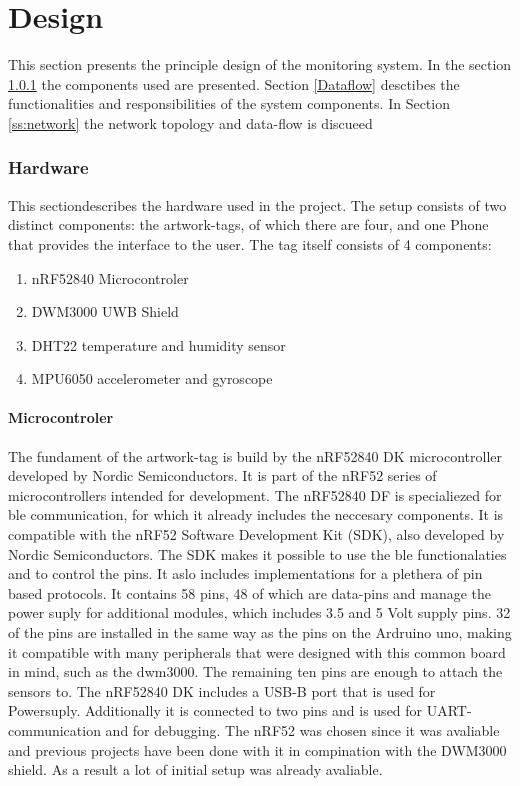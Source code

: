 \chapter{Design}

This section presents the principle design of the monitoring system.
In the section \ref{ss:hardware} the components used are presented.
Section \ref{Dataflow} desctibes the functionalities and responsibilities of the system components.
In Section \ref{ss:network} the network topology and data-flow is discueed

\subsection{Hardware}
\label{ss:hardware}

This sectiondescribes the hardware used in the project. The setup consists of two distinct components: the artwork-tags, of which there are four, and one Phone that provides the interface to the user. The tag itself consists of 4 components:
\begin{enumerate}
	\item nRF52840 Microcontroler
	\item DWM3000 UWB Shield
	\item DHT22 temperature and humidity sensor
	\item MPU6050 accelerometer and gyroscope
\end{enumerate}

\subsubsection{Microcontroler}
The fundament of the artwork-tag is build by the nRF52840 DK microcontroller developed by Nordic Semiconductors. 
It is part of the nRF52 series of microcontrollers intended for development.
The nRF52840 DF is specialiezed for ble communication, for which it already includes the neccesary components.
It is compatible with the nRF52 Software Development Kit (SDK), also developed by Nordic Semiconductors.
The SDK makes it possible to use the ble functionalaties and to control the pins. It aslo includes implementations for a plethera of pin based protocols.
It contains 58 pins, 48 of which are data-pins and manage the power suply for additional modules, which includes 3.5 and 5 Volt supply pins.
32 of the pins are installed in the same way as the pins on the Ardruino uno, making it compatible with many peripherals that were designed with this common board in mind, such as the dwm3000.
The remaining ten pins are enough to attach the sensors to.
The nRF52840 DK includes a USB-B port that is used for Powersuply. Additionally it is connected to two pins and is used for UART-communication and for debugging.
The nRF52 was chosen since it was avaliable and previous projects have been done with it in compination with the DWM3000 shield.
As a result a lot of initial setup was already avaliable.

